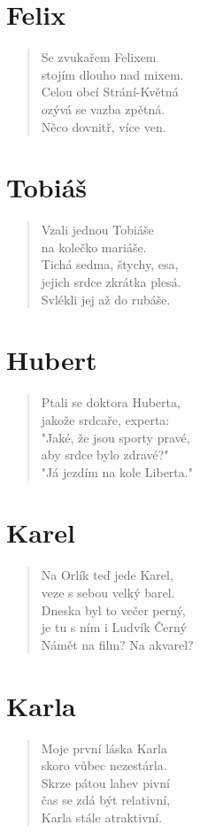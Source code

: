 \section*{Felix}
\begin{verse}
Se zvukařem Felixem\\
stojím dlouho nad mixem.\\
Celou obcí Strání-Květná\\
ozývá se vazba zpětná.\\
Něco dovnitř, více ven.
\end{verse}

\section*{Tobiáš}
\begin{verse}
Vzali jednou Tobiáše\\
na kolečko mariáše.\\
Tichá sedma, štychy, esa,\\
jejich srdce zkrátka plesá.\\
Svlékli jej až do rubáše.
\end{verse}

\section*{Hubert}
\begin{verse}
Ptali se doktora Huberta,\\
jakože srdcaře, experta:\\
"Jaké, že jsou sporty pravé,\\
aby srdce bylo zdravé?"\\
"Já jezdím na kole Liberta."
\end{verse}

\section*{Karel}
\begin{verse}
Na Orlík teď jede Karel,\\
veze s sebou velký barel.\\
Dneska byl to večer perný,\\
je tu s ním i Ludvík Černý\\
Námět na film? Na akvarel?
\end{verse}

\section*{Karla}
\begin{verse}
Moje první láska Karla\\
skoro vůbec nezestárla.\\
Skrze pátou lahev pivní\\
čas se zdá být relativní,\\
Karla stále atraktivní.
\end{verse}

